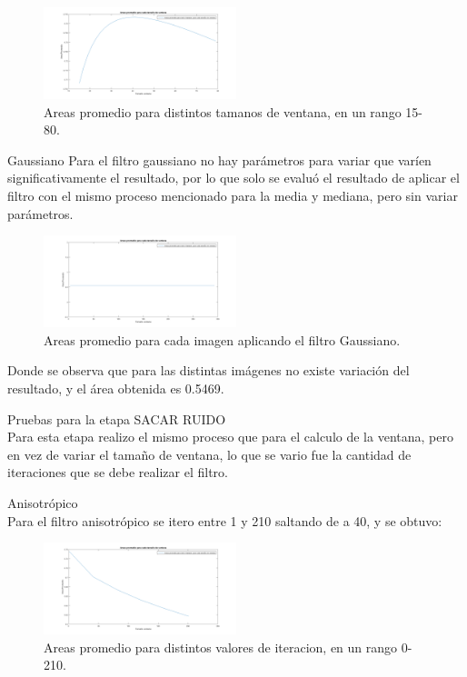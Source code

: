 \begin{figure}[h]
	{
	\centering
	\includegraphics[width=0.50\textwidth]{Figures/MediaRangoChico}
	\caption[An Electron]{Areas promedio para distintos tamanos de ventana, en un rango 15-80.}
	}
\end{figure}

Gaussiano 
Para el filtro gaussiano no hay parámetros para variar que varíen significativamente el resultado, por lo que solo se evaluó el resultado de aplicar el filtro con el mismo proceso mencionado para la media y mediana, pero sin variar parámetros. 

\begin{figure}[h]
	{
	\centering
	\includegraphics[width=0.50\textwidth]{Figures/Gaussiano}
	\caption[An Electron]{Areas promedio para cada imagen aplicando el filtro Gaussiano.}
	}
\end{figure}

Donde se observa que para las distintas imágenes no existe variación del resultado, y el área obtenida es 0.5469.


Pruebas para la etapa SACAR  RUIDO\\
Para esta etapa realizo el mismo proceso   que para el calculo de la ventana, pero en vez de variar el tamaño de ventana,  lo que se vario fue la cantidad de iteraciones que se debe realizar el filtro. 


Anisotrópico\\
Para el filtro anisotrópico se itero entre 1 y 210 saltando de a 40, y se obtuvo:

\begin{figure}[h]
	{
	\centering
	\includegraphics[width=0.50\textwidth]{Figures/AnisotropicoRangoGrande}
	\caption[An Electron]{Areas promedio para distintos valores de iteracion, en un rango 0-210.}
	}
\end{figure}


